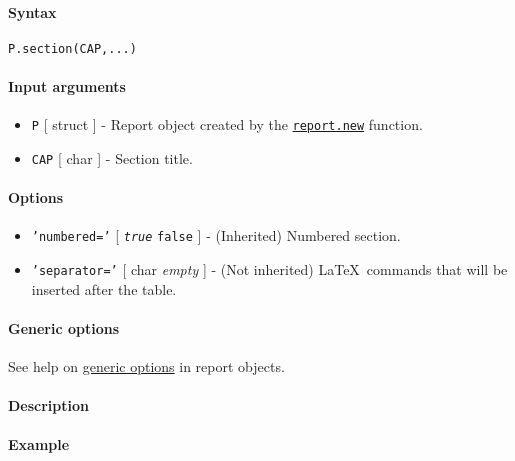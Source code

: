 


	\paragraph{Syntax}\label{syntax}

\begin{verbatim}
P.section(CAP,...)
\end{verbatim}

\paragraph{Input arguments}\label{input-arguments}

\begin{itemize}
\item
  \texttt{P} {[} struct {]} - Report object created by the
  \href{report/new}{\texttt{report.new}} function.
\item
  \texttt{CAP} {[} char {]} - Section title.
\end{itemize}

\paragraph{Options}\label{options}

\begin{itemize}
\item
  \texttt{'numbered='} {[} \emph{\texttt{true}} \textbar{}
  \texttt{false} {]} - (Inherited) Numbered section.
\item
  \texttt{'separator='} {[} char \textbar{} \emph{empty} {]} - (Not
  inherited) \LaTeX~commands that will be inserted after the table.
\end{itemize}

\paragraph{Generic options}\label{generic-options}

See help on \href{report/Contents}{generic options} in report objects.

\paragraph{Description}\label{description}

\paragraph{Example}\label{example}


